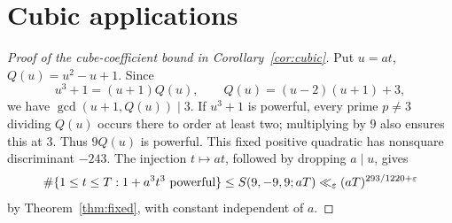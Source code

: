 \documentclass[11pt,reqno]{amsart}
\theoremstyle{definition}
\theoremstyle{remark}
\numberwithin{equation}{section}
\newcommand{\eps}{\varepsilon}\newcommand{\card}{\#}
\begin{document}
\section{Cubic applications}\label{sec:A4}
\begin{proof}[Proof of the cube-coefficient bound in Corollary~\ref{cor:cubic}]
Put $u=at$, $Q(u)=u^2-u+1$. Since
\[
 u^3+1=(u+1)Q(u),\qquad Q(u)=(u-2)(u+1)+3,
\]
we have $\gcd(u+1,Q(u))\mid3$. If $u^3+1$ is powerful, every prime
$p\ne3$ dividing $Q(u)$ occurs there to order at least two; multiplying
by $9$ also ensures this at $3$. Thus $9Q(u)$ is powerful.
This fixed positive quadratic has nonsquare discriminant $-243$.
The injection $t\mapsto at$, followed by dropping $a\mid u$, gives
\[
 \card\{1\le t\le T:1+a^3t^3\textnormal{ powerful}\}
 \le S(9,-9,9;aT)\ll_\eps(aT)^{293/1220+\eps}
\]
by Theorem~\ref{thm:fixed}, with constant independent of $a$.
\end{proof}
\end{document}
